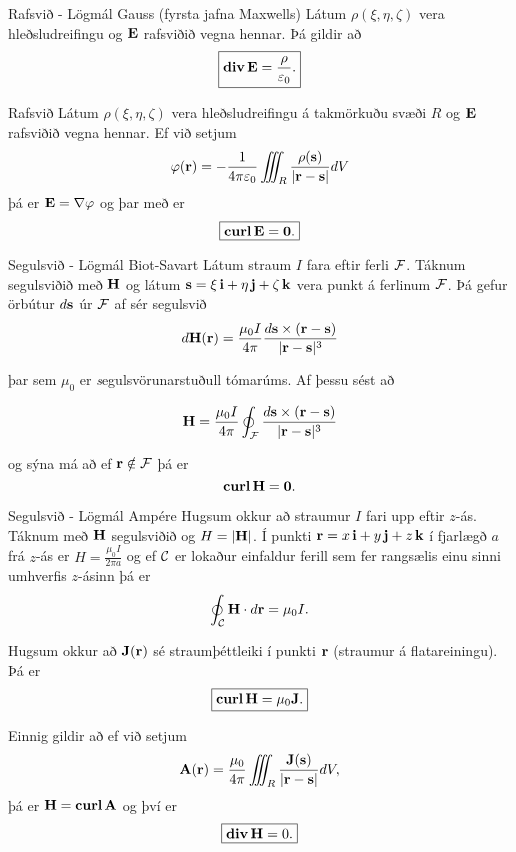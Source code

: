 \begin{frame}{} 

\begin {block}{Rafsvið  \rtask{} - Lögmál Gauss (fyrsta jafna Maxwells)}
 Látum $\rho(\xi,\eta,\zeta)$ vera hleðsludreifingu og $\mbox{${\bf E}$}$ rafsviðið vegna hennar.  Þá gildir að 
$$\boxed{\mbox{${\rm\bf div\,}$}\mbox{${\bf E}$}=\frac{\rho}{\varepsilon_0}.}$$
\end{block}
\begin {block}{Rafsvið \rtask{}}
 Látum $\rho(\xi,\eta,\zeta)$ vera hleðsludreifingu á takmörkuðu svæði $R$ og $\mbox{${\bf E}$}$ rafsviðið vegna hennar.  Ef við setjum
 $$ \varphi(\mbox{${\bf r}$}) = -\frac{1}{4 \pi \varepsilon_0} \iiint_R \frac{\rho(\mbox{${\bf s}$})}{|\mbox{${\bf r}$}-\mbox{${\bf s}$}|} dV$$
 þá er $\mbox{${\bf E}$} = \nabla \varphi$ og þar með er 
$$\boxed{\mbox{${\rm\bf curl\,}$} \mbox{${\bf E}$}= \mathbf{0}.}$$
\end{block}
\end{frame}



\begin{frame}{} 

\begin {block}{Segulsvið \rtask{} - Lögmál Biot-Savart }
 Látum straum $I$ fara eftir ferli $\cal F$.  Táknum segulsviðið með $\mbox{${\bf H}$}$ og látum $\mbox{${\bf s}$}=\xi\,\mbox{${\bf i}$}+\eta\,\mbox{${\bf j}$}+\zeta\,\mbox{${\bf k}$}$ vera punkt á ferlinum $\cal F$.  Þá gefur örbútur $d\mbox{${\bf s}$}$ úr $\cal F$ af sér segulsvið 
$$d\mbox{${\bf H}$}(\mbox{${\bf r}$})=\frac{\mu_0 I}{4\pi}\frac{d\mbox{${\bf s}$}\times(\mbox{${\bf r}$}-\mbox{${\bf s}$})}{|\mbox{${\bf r}$}-\mbox{${\bf s}$}|^3}$$

þar sem $\mu_0$ er {\emph segulsvörunarstuðull} tómarúms. Af þessu sést að 


$$\mbox{${\bf H}$}=\frac{\mu_0 I}{4\pi}\oint_{\cal F}
\frac{d\mbox{${\bf s}$}\times(\mbox{${\bf r}$}-\mbox{${\bf s}$})}{|\mbox{${\bf r}$}-\mbox{${\bf s}$}|^3}$$

og sýna má að ef $\mbox{${\bf r}$} \notin \mathcal{F}$ þá er $$\mbox{${\rm\bf curl\,}$} \mbox{${\bf H}$} = \mathbf{0}.$$

\end{block}

\end{frame}



\begin{frame}{} 

\begin {block}{Segulsvið \rtask{} - Lögmál Ampére}
 Hugsum okkur að straumur $I$ fari upp eftir $z$-ás.  Táknum með $\mbox{${\bf H}$}$ segulsviðið og $H=|\mbox{${\bf H}$}|$.  Í punkti  $\mbox{${\bf r}$}=x\,\mbox{${\bf i}$}+y\,\mbox{${\bf j}$}+z\,\mbox{${\bf k}$}$ í fjarlægð $a$ frá $z$-ás er $H=\frac{\mu_0 I}{2\pi a}$ og ef $\cal C$ er lokaður einfaldur ferill sem fer rangsælis einu sinni umhverfis $z$-ásinn þá er 
$$\oint_{\cal C} \mbox{${\bf H}$}\cdot d\mbox{${\bf r}$}=\mu_0 I.$$

 Hugsum okkur að $\mathbf{J}(\mbox{${\bf r}$})$ sé straumþéttleiki í punkti $\mbox{${\bf r}$}$ (straumur á flatareiningu).  Þá er 
$$ \boxed{\mbox{${\rm\bf curl\,}$} \mbox{${\bf H}$} = \mu_0 \mathbf{J}.}$$
\end{block}
Einnig gildir að ef við setjum 
$$\mbox{${\bf A}$}(\mbox{${\bf r}$})=\frac{\mu_0}{4\pi}\iiint_{R}
\frac{\mathbf{J}(\mathbf{s})}{|\mbox{${\bf r}$}-\mbox{${\bf s}$}|}dV,$$
þá er $\mbox{${\bf H}$}=\mbox{${\rm\bf curl\,}$} \mbox{${\bf A}$}$  og því er $$\boxed{\mbox{${\rm\bf div\,}$} \mbox{${\bf H}$}=0.}$$
\end{frame}

